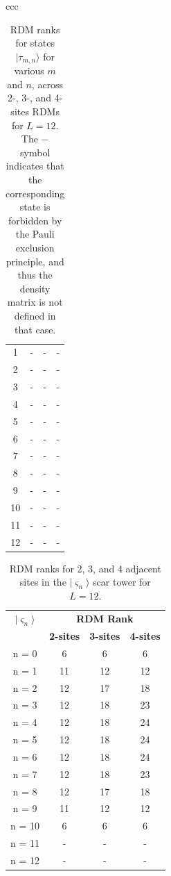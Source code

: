 \documentclass[11pt]{article}
\begin{document}
\begin{itemize}
\begin{itemize}
\begin{table}[H]
\begin{tabular}{ccc}
\begin{tabular}{|c|c|c|c|}
	1 & - & - & - \\
	2 & - & - & - \\
	3 & - & - & - \\
	4 & - & - & - \\
	5 & - & - & - \\
	6 & - & - & - \\
	7 & - & - & - \\
	8 & - & - & - \\
	9 & - & - & - \\
	10 & - & - & - \\
	11 & - & - & - \\
	12 & - & - & - \\
	\hline
\end{tabular}
\end{tabular}

\caption{RDM ranks for states $|\tau_{m,n}\rangle$ for various $m$ and $n$, across 2-, 3-, and 4-sites RDMs for $L=12$. The $-$ symbol indicates that the corresponding state is forbidden by the Pauli exclusion principle, and thus the density matrix is not defined in that case.}
\end{table}

	
\begin{table}[H]
	\centering
	\begin{tabular}{|c|ccc|}
	\hline
	\textbf{$|\varsigma_n\rangle$} & \multicolumn{3}{c|}{\textbf{RDM Rank}} \\
	\cline{2-4}
	& \textbf{2-sites} & \textbf{3-sites} & \textbf{4-sites}\\
	\hline
	 n = 0 & 6 & 6 & 6 \\
	 n = 1 & 11 & 12 & 12 \\
	 n = 2 & 12 & 17 & 18 \\
	 n = 3 & 12 & 18 & 23 \\
	 n = 4 & 12 & 18 & 24 \\  
	 n = 5 & 12 & 18 & 24 \\
	 n = 6 & 12 & 18 & 24 \\
	 n = 7 & 12 & 18 & 23 \\
	 n = 8 & 12 & 17 & 18 \\
	 n = 9 & 11 & 12 & 12 \\
	 n = 10 & 6 & 6 & 6 \\
	 n = 11 & - & - & - \\
	 n = 12 & - & - & - \\
	\hline
	\end{tabular}
	\caption{RDM ranks for 2, 3, and 4 adjacent sites in the $|\varsigma_n\rangle$ scar tower for $L=12$.}
	\label{tab:ranks22}
	\end{table}


\end{itemize}
\end{itemize}
\end{document}
